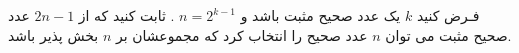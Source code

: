 \exercise
فـرض کنید
$k$
یک عدد صحیح مثبت باشد و
$n = 2^{k-1}$
. ثابت کنید که از
$2n - 1$
عدد صحیح مثبت می توان
$n$
عدد صحیح را انتخاب کرد که مجموعشان بر
$n$
بخش پذیر باشد.